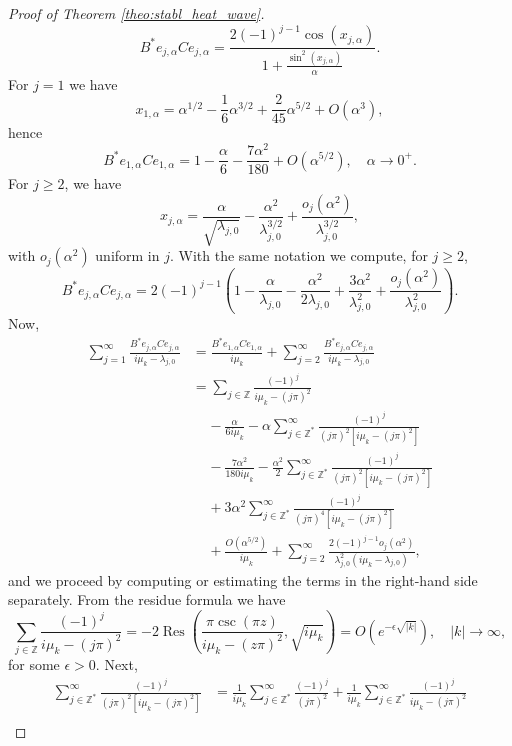 \documentclass[10pt]{article}
\newcommand{\opRes}{\operatorname{Res}}
\begin{document}
\begin{proof}[Proof of Theorem \ref{theo:stabl_heat_wave}]
\[ 
B^* e_{j,\alpha} C e_{j,\alpha} = \frac{2(-1)^{j-1} \cos(x_{j,\alpha})}{1+\displaystyle\frac{\sin^2(x_{j,\alpha})}{\alpha}}.
\]
For $j=1$ we have 
\[
x_{1,\alpha} = \alpha^{1/2} - \frac{1}{6} \alpha^{3/2} + \frac{2}{45} \alpha^{5/2} + O(\alpha^3),
\]
hence 
\[
B^*e_{1,\alpha} Ce_{1,\alpha} = 1 - \frac{\alpha}{6} - \frac{7\alpha^2 }{180} + O( \alpha^{5/2}),\quad \alpha \to 0^+.
\]
For $j \geq 2$, we have 
\[
x_{j,\alpha} = \frac{\alpha}{\sqrt{\lambda_{j,0}}} - \frac{\alpha^2}{\lambda_{j,0}^{3/2}} + \frac{o_j(\alpha^2)}{\lambda_{j,0}^{3/2}},
\]
with $o_j(\alpha^2)$ uniform in $j$. With the same notation we compute, for $j \geq 2$, 
\[
B^* e_{j,\alpha} C e_{j,\alpha} = 2(-1)^{j-1} \left( 1 - \frac{\alpha}{\lambda_{j,0}} - \frac{\alpha^2}{2\lambda_{j,0}} + \frac{3\alpha^2}{\lambda_{j,0}^2} + \frac{o_j(\alpha^2)}{\lambda_{j,0}^2}\right). 
\]
Now, 
\begin{align*}
\sum_{j=1}^\infty \frac{B^* e_{j,\alpha} C e_{j,\alpha}}{i \mu_k - \lambda_{j,0}} &= \frac{B^*e_{1,\alpha} Ce_{1,\alpha}}{i\mu_k} + \sum_{j=2}^\infty \frac{B^* e_{j,\alpha} C e_{j,\alpha}}{i \mu_k - \lambda_{j,0}} \\
&= \sum_{j \in \mathbb{Z}} \frac{(-1)^j}{i\mu_k - (j\pi)^2} \\
&~~~~~- \frac{\alpha}{6i\mu_k} -\alpha \sum_{j \in \mathbb{Z}^*}^\infty \frac{(-1)^{j}}{(j\pi)^2[i\mu_k - (j\pi)^2]} \\
&~~~~~- \frac{7\alpha^2}{180 i \mu_k} - \frac{\alpha^2}{2} \sum_{j \in \mathbb{Z}^*}^\infty \frac{(-1)^{j}}{(j\pi)^2[i\mu_k - (j\pi)^2]} \\
&~~~~~+ 3 \alpha^2 \sum_{j \in \mathbb{Z}^*}^\infty \frac{(-1)^{j}}{(j\pi)^4[i\mu_k-(j\pi)^2]} \\
&~~~~~+ \frac{O(\alpha^{5/2})}{i\mu_k} + \sum_{j=2}^\infty \frac{2(-1)^{j-1}o_j(\alpha^2)}{\lambda_{j,0}^2(i\mu_k-\lambda_{j,0})},
\end{align*}
and we proceed by computing or estimating the terms in the right-hand side separately. From the residue formula we have 
\[
\sum_{j \in \mathbb{Z}} \frac{(-1)^j}{i\mu_k - (j\pi)^2} = -2\opRes\left( \frac{\pi \csc(\pi z)}{i\mu_k - (z\pi)^2},\sqrt{i\mu_k} \right) = O(e^{-\epsilon\sqrt{|k|}}),\quad |k| \to \infty,
\]
for some $\epsilon > 0$. Next, 
\begin{align*}
\sum_{j \in \mathbb{Z}^*}^\infty \frac{(-1)^{j}}{(j\pi)^2[i\mu_k - (j\pi)^2]} &= \frac{1}{i\mu_k} \sum_{j \in \mathbb{Z}^*}^\infty \frac{(-1)^{j}}{(j\pi)^2} + \frac{1}{i\mu_k} \sum_{j \in \mathbb{Z}^*}^\infty \frac{(-1)^{j}}{i\mu_k - (j\pi)^2} \\

\end{align*}
\end{proof}
\end{document}
